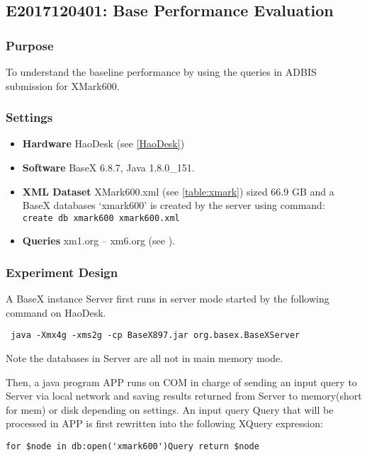 \subsection{E2017120401: Base Performance Evaluation}
 
\subsubsection{Purpose}
To understand the baseline performance by using
the queries in ADBIS submission for XMark600.
 
\subsubsection{Settings} 

\begin{itemize}

\item \textbf{Hardware} HaoDesk (see \ref{HaoDesk})\\
\item \textbf{Software} BaseX 6.8.7, Java 1.8.0\_151.\\
\item \textbf{XML Dataset} XMark600.xml (see \ref{table:xmark}) sized 66.9 GB and
a BaseX databases `xmark600' is created by the server using command:\\
\verb|create db xmark600 xmark600.xml|
\item \textbf{Queries} xm1.org -- xm6.org (see ).

\end{itemize}


\subsubsection{Experiment Design}  

A BaseX instance Server first runs in server mode started by the following
command on HaoDesk.

\verb| java -Xmx4g -xms2g -cp BaseX897.jar org.basex.BaseXServer|

Note the databases in Server are all not in main memory mode.

Then, a java program APP runs on COM in charge of sending an input query to
Server via local network and saving results returned from Server to memory(short
for mem) or disk depending on settings. An input query Query that will be
processed in APP is first rewritten into the following XQuery expression:

\verb|for $node in db:open('xmark600')Query return $node|

